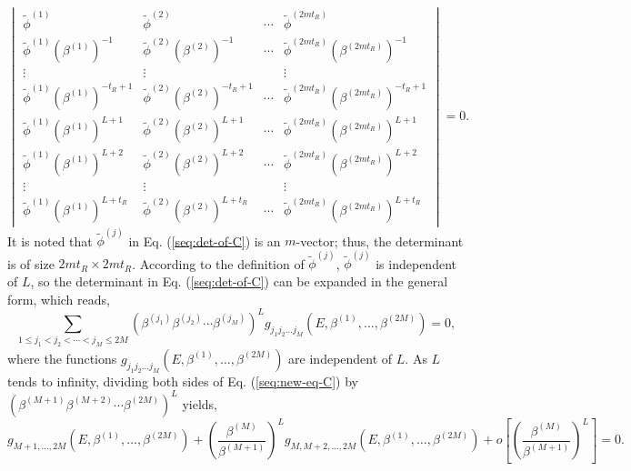 \begin{equation}
\begin{vmatrix}\tilde{\phi}^{(1)} & \tilde{\phi}^{(2)} & \cdots & \tilde{\phi}^{(2mt_{R})}\\
\tilde{\phi}^{(1)}\left(\beta^{(1)}\right)^{-1} & \tilde{\phi}^{(2)}\left(\beta^{(2)}\right)^{-1} & \cdots & \tilde{\phi}^{(2mt_{R})}\left(\beta^{(2mt_{R})}\right)^{-1}\\
\vdots & \vdots &  & \vdots\\
\tilde{\phi}^{(1)}\left(\beta^{(1)}\right)^{-t_{R}+1} & \tilde{\phi}^{(2)}\left(\beta^{(2)}\right)^{-t_{R}+1} & \cdots & \tilde{\phi}^{(2mt_{R})}\left(\beta^{(2mt_{R})}\right)^{-t_{R}+1}\\
\tilde{\phi}^{(1)}\left(\beta^{(1)}\right)^{L+1} & \tilde{\phi}^{(2)}\left(\beta^{(2)}\right)^{L+1} & \cdots & \tilde{\phi}^{(2mt_{R})}\left(\beta^{(2mt_{R})}\right)^{L+1}\\
\tilde{\phi}^{(1)}\left(\beta^{(1)}\right)^{L+2} & \tilde{\phi}^{(2)}\left(\beta^{(2)}\right)^{L+2} & \cdots & \tilde{\phi}^{(2mt_{R})}\left(\beta^{(2mt_{R})}\right)^{L+2}\\
\vdots & \vdots &  & \vdots\\
\tilde{\phi}^{(1)}\left(\beta^{(1)}\right)^{L+t_{R}} & \tilde{\phi}^{(2)}\left(\beta^{(2)}\right)^{L+t_{R}} & \cdots & \tilde{\phi}^{(2mt_{R})}\left(\beta^{(2mt_{R})}\right)^{L+t_{R}}
\end{vmatrix}=0.\label{seq:det-of-C}
\end{equation}
It is noted that $\tilde{\phi}^{(j)}$ in Eq. (\ref{seq:det-of-C})
is an $m$-vector; thus, the determinant is of size $2mt_{R}\times2mt_{R}$.
According to the definition of $\tilde{\phi}^{(j)}$, $\tilde{\phi}^{(j)}$
is independent of $L$, so the determinant in Eq. (\ref{seq:det-of-C})
can be expanded in the general form, which reads, 
\begin{equation}
\sum_{1\leq j_{1}<j_{2}<\cdots<j_{M_{}}\leq2M}\left(\beta^{(j_{1})}\beta^{(j_{2})}\cdots\beta^{(j_{M})}\right)^{L}g_{j_{1}j_{2}\dots j_{M}}\left(E,\beta^{(1)},\dots,\beta^{(2M)}\right)=0,\label{seq:new-eq-C}
\end{equation}
where the functions $g_{j_{1}j_{2}\dots j_{M}}\left(E,\beta^{(1)},\dots,\beta^{(2M)}\right)$
are independent of $L$. As $L$ tends to infinity, dividing both
sides of Eq. (\ref{seq:new-eq-C}) by $\left(\beta^{(M+1)}\beta^{(M+2)}\cdots\beta^{(2M)}\right)^{L}$
yields, 
\begin{equation}
g_{M+1,\dots,2M}\left(E,\beta^{(1)},\dots,\beta^{(2M)}\right)+\left(\frac{\beta^{(M)}}{\beta^{(M+1)}}\right)^{L}g_{M,M+2,\dots,2M}\left(E,\beta^{(1)},\dots,\beta^{(2M)}\right)+o\left[\left(\frac{\beta^{(M)}}{\beta^{(M+1)}}\right)^{L}\right]=0.\label{seq:simplified-eq}
\end{equation}
